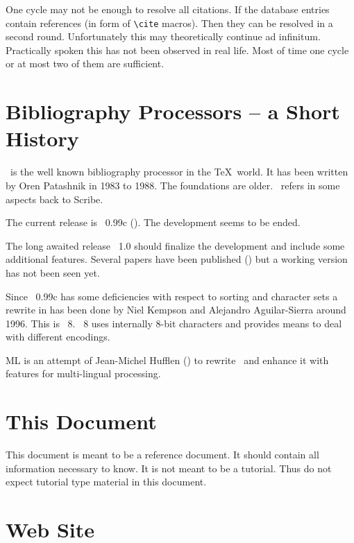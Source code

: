 One cycle may not be enough to resolve all citations. If the database
entries contain references (in form of \verb|\cite|
macros). Then they can be resolved in a
second round. Unfortunately this may theoretically continue ad
infinitum. Practically spoken this has not been observed in real life.
Most of time one cycle or at most two of them are sufficient.


\section{Bibliography Processors -- a Short History}

\BibTeX\ is the well known bibliography processor in the \TeX\ world.
It has been written by Oren Patashnik in 1983
to 1988. The foundations are older. \BibTeX\ refers in some aspects
back to Scribe.

The current release is \BibTeX~0.99c (\cite{btxdoc,btxhak}). The
development seems to be ended.

The long awaited release \BibTeX~1.0 should finalize the development
and include some additional features. Several papers have been published
(\cite{patashnik:bibtex1.0,patashnik:bibtex}) but a working version
has not been seen yet.

Since \BibTeX~0.99c has some deficiencies with respect to sorting and
character sets a rewrite in has been done by Niel
Kempson and Alejandro
Aguilar-Sierra around 1996. This is
\BibTeX~8. \BibTeX~8 uses internally 8-bit characters and provides
means to deal with different encodings.


ML\BibTeX{} is an attempt of Jean-Michel
Hufflen (\cite{hufflenO1b:oip}) to rewrite
\BibTeX\ and enhance it with features for multi-lingual processing.

\INCOMPLETE


\section{This Document}

This document is meant to be a reference document. It should contain
all information necessary to know. It is not meant to be a tutorial.
Thus do not expect tutorial type material in this document.


\section{Web Site}%

